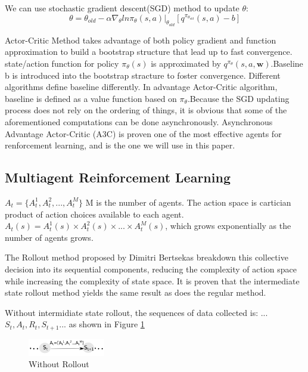 \documentclass[journal]{IEEEtran}
\begin{document}
We can use stochastic gradient descent(SGD) method to update $\theta$:
\begin{equation}
    \theta=\theta_{old}-\alpha \nabla_{\theta}ln\pi_{\theta}(s,a)|_{\theta_{old}}[q^{\pi_{\theta_{old}}}(s,a)-b]
\end{equation}

Actor-Critic Method takes advantage of both policy gradient and function approximation to build a bootstrap structure that lead up to fast convergence. state/action function for policy $\pi_{\theta}(s)$ is approximated by $q^{\pi_{\theta}}(s,a,\textbf{w})$.Baseline b is introduced into the bootstrap stracture to foster convergence. Different algorithms define baseline differently. In advantage Actor-Critic algorithm, baseline is defined as a value function based on $\pi_{\theta}$.Because the SGD updating process does not rely on the ordering of things, it is obvious that some of the aforementioned computations can be done asynchronously. Asynchronous Advantage Actor-Critic (A3C) is proven one of the most effective agents for renforcement learning, and is the one we will use in this paper.

\subsection{Multiagent Reinforcement Learning}
$A_t=\{A_t^1,A_t^2,...,A_t^M\}$ M is the number of agents. The action space is cartician product of action choices available to each agent. $A_t(s)=A_t^1(s) \times A_t^2(s) \times ... \times A_t^M(s)$, which grows exponentially as the number of agents grows.

The Rollout method proposed by Dimitri Bertsekas breakdown this collective decision into its sequential components, reducing the complexity of action space while increasing the complexity of state space. It is proven that the intermediate state rollout method yields the same result as does the regular method. \cite{Bertsekas2019MultiagentRA}

Without intermidiate state rollout, the sequences of data collected is:
...$S_t, A_t, R_t, S_{t+1}$... as shown in Figure \ref{fig:without}

\begin{figure}[H]
\centering
\includegraphics[width=0.3\textwidth]{without.png}
\caption{Without Rollout}
\label{fig:without}
\end{figure}
\end{document}
